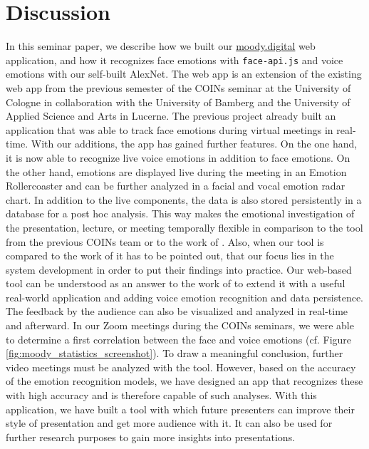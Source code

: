\section{Discussion}
\label{sec:Discussion}
In this seminar paper, we describe how we built our \url{moody.digital} web application, and how it recognizes face emotions with \texttt{face-api.js} and voice emotions with our self-built AlexNet. The web app is an extension of the existing web app from the previous semester of the COINs seminar at the University of Cologne in collaboration with the University of Bamberg and the University of Applied Science and Arts in Lucerne. The previous project already built an application that was able to track face emotions during virtual meetings in real-time. With our additions, the app has gained further features. On the one hand, it is now able to recognize live voice emotions in addition to face emotions. On the other hand, emotions are displayed live during the meeting in an Emotion Rollercoaster and can be further analyzed in a facial and vocal emotion radar chart. In addition to the live components, the data is also stored persistently in a database for a post hoc analysis. This way makes the emotional investigation of the presentation, lecture, or meeting temporally flexible in comparison to the tool from the previous COINs team or to the work of \citeauthor{rosler_reducing_2021}. Also, when our tool is compared to the work of \citeauthor{rosler_reducing_2021} it has to be pointed out, that our focus lies in the system development in order to put their findings into practice. Our web-based tool can be understood as an answer to the work of \citeauthor{rosler_reducing_2021} to extend it with a useful real-world application and adding voice emotion recognition and data persistence. The feedback by the audience can also be visualized and analyzed in real-time and afterward. In our Zoom meetings during the COINs seminars, we were able to determine a first correlation between the face and voice emotions (cf. Figure \ref{fig:moody_statistics_screenshot}). To draw a meaningful conclusion, further video meetings must be analyzed with the tool. However, based on the accuracy of the emotion recognition models, we have designed an app that recognizes these with high accuracy and is therefore capable of such analyses. 
With this application, we have built a tool with which future presenters can improve their style of presentation and get more audience with it. It can also be used for further research purposes to gain more insights into presentations.

